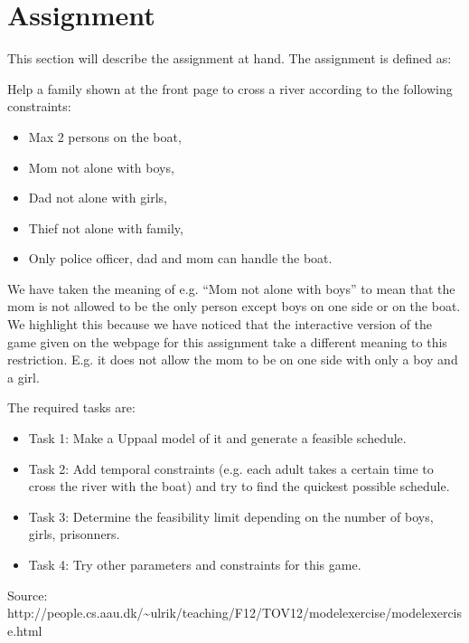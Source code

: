 \section{Assignment}
This section will describe the assignment at hand.
The assignment is defined as:

Help a family shown at the front page to cross a river according to the following constraints:
\begin{itemize}
	\item Max 2 persons on the boat,
	\item Mom not alone with boys,
	\item Dad not alone with girls,
	\item Thief not alone with family,
	\item Only police officer, dad and mom can handle the boat.
\end{itemize}
We have taken the meaning of e.g. ``Mom not alone with boys'' to mean that the mom is not allowed to be the only person except boys on one side or on the boat.
We highlight this because we have noticed that the interactive version of the game given on the webpage for this assignment take a different meaning to this restriction.
E.g. it does not allow the mom to be on one side with only a boy and a girl.

The required tasks are:
\begin{itemize}
	\item Task 1: Make a Uppaal model of it and generate a feasible schedule.
  \item Task 2: Add temporal constraints (e.g. each adult takes a certain time to cross the river with the boat) and try to find the quickest possible schedule.
  \item Task 3: Determine the feasibility limit depending on the number of boys, girls, prisonners.
  \item Task 4: Try other parameters and constraints for this game.
\end{itemize}
Source: http://people.cs.aau.dk/\textasciitilde{}ulrik/teaching/F12/TOV12/modelexercise/modelexercise.html